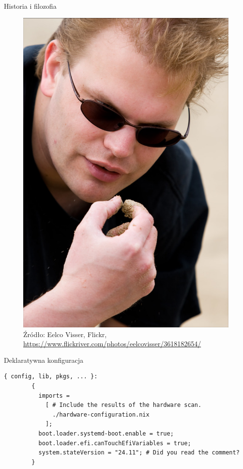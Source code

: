 \documentclass{beamer}
\begin{document}
\begin{frame}{Historia i filozofia}
    \begin{figure}
        \includegraphics[height=0.75\textheight]{./assets/eelco.jpg}
        \caption*{\scriptsize Źródło: Eelco Visser, Flickr, \url{https://www.flickriver.com/photos/eelcovisser/3618182654/}}
    \end{figure}
\end{frame}

\begin{frame}{Deklaratywna konfiguracja}
    \begin{lstlisting}[basicstyle=\small, caption=Generated Configuration]
        { config, lib, pkgs, ... }:
        {
          imports =
            [ # Include the results of the hardware scan.
              ./hardware-configuration.nix
            ];
          boot.loader.systemd-boot.enable = true;
          boot.loader.efi.canTouchEfiVariables = true;
          system.stateVersion = "24.11"; # Did you read the comment?
        }
    \end{lstlisting}
\end{frame}
\end{document}
